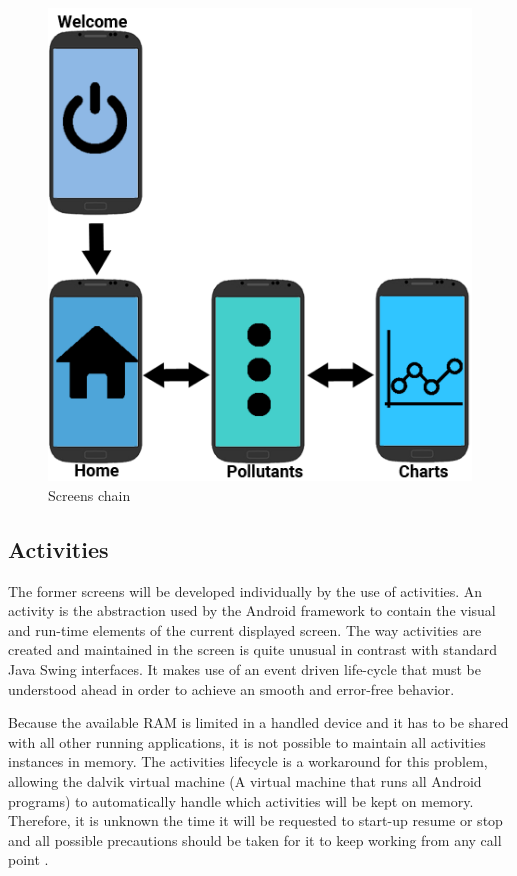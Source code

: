 \begin{figure}[H]
\begin{adjustbox}{width=.45\textwidth,center=\textwidth}
  \centering
  \includegraphics[scale=1]{images/screenChain.png}
\end{adjustbox}
  \caption[Screens chain]{Screens chain}
  \label{fig:architecture}
\end{figure}

\subsection{Activities}
The former screens will be developed individually by the use of activities. An activity is the abstraction used by the Android framework to contain the visual and run-time elements of the current displayed screen. The way activities are created and maintained in the screen is quite unusual in contrast with standard Java Swing interfaces. It makes use of an event driven life-cycle that must be understood ahead in order to achieve an smooth and error-free behavior. 

Because the available RAM is limited in a handled device and it has to be shared with all other running applications, it is not possible to maintain  all activities instances in memory. The activities lifecycle is a workaround for this problem, allowing the dalvik virtual machine (A virtual machine that runs all Android programs) to automatically handle which activities will be kept on memory. Therefore, it is unknown the time it will be requested to start-up resume or stop and all possible precautions should be taken for it to keep working from any call point .

